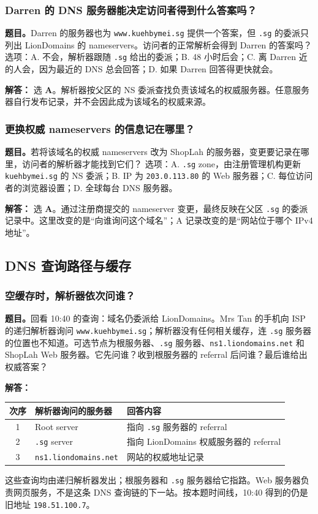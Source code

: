 \documentclass[11pt,a4paper,fontset=fandol]{ctexart}
\renewcommand{\exercisequestion}[2]{%
  \Needspace{5\baselineskip}%
  \subsubsection{#2}\label{exercise:#1}%
}
\renewenvironment{checkedsolution}
  {\par\nopagebreak[4]\textbf{解答：}\ignorespaces}
  {\par}
\begin{document}
\exercisequestion{SC2008-HW06-Q05}{Darren 的 DNS 服务器能决定访问者得到什么答案吗？}
\textbf{题目。}Darren 的服务器也为 \texttt{www.kuehbymei.sg} 提供一个答案，但 \texttt{.sg} 的委派只列出 LionDomains 的 nameservers。访问者的正常解析会得到 Darren 的答案吗？
选项：A. 不会，解析器跟随 \texttt{.sg} 给出的委派；B. 48 小时后会；C. 离 Darren 近的人会，因为最近的 DNS 总会回答；D. 如果 Darren 回答得更快就会。
\begin{checkedsolution}
选 \textbf{A}。解析器按父区的 NS 委派查找负责该域名的权威服务器。任意服务器自行发布记录，并不会因此成为该域名的权威来源。
\end{checkedsolution}

\exercisequestion{SC2008-HW06-Q06}{更换权威 nameservers 的信息记在哪里？}
\textbf{题目。}若将该域名的权威 nameservers 改为 ShopLah 的服务器，变更要记录在哪里，访问者的解析器才能找到它们？
选项：A. \texttt{.sg} zone，由注册管理机构更新 \texttt{kuehbymei.sg} 的 NS 委派；B. IP 为 \texttt{203.0.113.80} 的 Web 服务器；C. 每位访问者的浏览器设置；D. 全球每台 DNS 服务器。
\begin{checkedsolution}
选 \textbf{A}。通过注册商提交的 nameserver 变更，最终反映在父区 \texttt{.sg} 的委派记录中。这里改变的是“向谁询问这个域名”；A 记录改变的是“网站位于哪个 IPv4 地址”。
\end{checkedsolution}

\subsection{DNS 查询路径与缓存}

\exercisequestion{SC2008-HW06-Q07}{空缓存时，解析器依次问谁？}
\textbf{题目。}回看 10:40 的查询：域名仍委派给 LionDomains。Mrs Tan 的手机向 ISP 的递归解析器询问 \texttt{www.kuehbymei.sg}；解析器没有任何相关缓存，连 \texttt{.sg} 服务器的位置也不知道。可选节点为根服务器、\texttt{.sg} 服务器、\texttt{ns1.liondomains.net} 和 ShopLah Web 服务器。它先问谁？收到根服务器的 referral 后问谁？最后谁给出权威答案？
\begin{checkedsolution}
\begin{center}
\small
\begin{tabularx}{\linewidth}{@{}c l X@{}}
\toprule
次序 & 解析器询问的服务器 & 回答内容 \\
\midrule
1 & Root server & 指向 \texttt{.sg} 服务器的 referral \\
2 & \texttt{.sg} server & 指向 LionDomains 权威服务器的 referral \\
3 & \texttt{ns1.liondomains.net} & 网站的权威地址记录 \\
\bottomrule
\end{tabularx}
\end{center}
这些查询均由递归解析器发出；根服务器和 \texttt{.sg} 服务器给它指路。Web 服务器负责网页服务，不是这条 DNS 查询链的下一站。按本题时间线，10:40 得到的仍是旧地址 \texttt{198.51.100.7}。
\end{checkedsolution}
\end{document}
